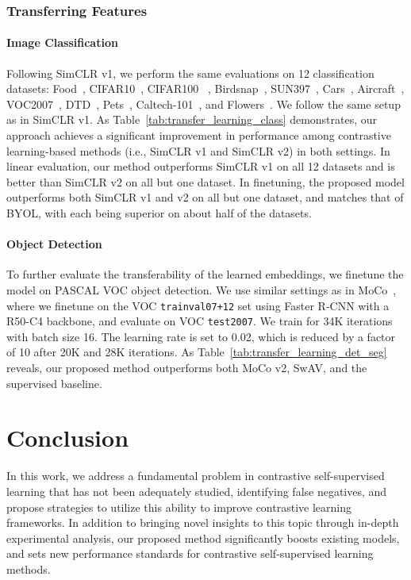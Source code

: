 \documentclass[10pt,twocolumn,letterpaper]{article}
\begin{document}
\subsubsection{Transferring Features}

\paragraph{Image Classification} Following SimCLR v1, we perform the same evaluations on 12 classification datasets: Food~\cite{food101}, CIFAR10~\cite{cifar10-cifar100}, CIFAR100 ~\cite{cifar10-cifar100}, Birdsnap~\cite{birdsnap}, SUN397~\cite{sun397}, Cars~\cite{cars}, Aircraft~\cite{aircraft}, VOC2007~\cite{voc2007-voc2012}, DTD~\cite{DTD}, Pets~\cite{pets}, Caltech-101~\cite{caltech-101}, and Flowers~\cite{flowers}. We follow the same setup as in SimCLR v1. As Table~\ref{tab:transfer_learning_class} demonstrates, our approach achieves a significant improvement in performance among contrastive learning-based methods (i.e., SimCLR v1 and SimCLR v2) in both settings. In linear evaluation, our method outperforms SimCLR v1 on all 12 datasets and is better than SimCLR v2 on all but one dataset. In finetuning, the proposed model outperforms both SimCLR v1 and v2 on all but one dataset, and matches that of BYOL, with each being superior on about half of the datasets.
\vspace{-9pt}
\paragraph{Object Detection} To further evaluate the transferability of the learned embeddings, we finetune the model on PASCAL VOC object detection. We use similar settings as in MoCo~\cite{he2019moco}, where we finetune on the VOC \verb|trainval07+12| set using Faster R-CNN with a R50-C4 backbone, and evaluate on VOC \verb|test2007|. We train for 34K iterations with batch size 16. The learning rate is set to 0.02, which is reduced by a factor of 10 after 20K and 28K iterations.
As Table~\ref{tab:transfer_learning_det_seg} reveals, our proposed method outperforms both MoCo v2, SwAV, and the supervised baseline.

 \section{Conclusion}
\label{sec:conclusion}
In this work, we address a fundamental problem in contrastive self-supervised learning that has not been adequately studied, identifying false negatives, and propose strategies to utilize this ability to improve contrastive learning frameworks. In addition to bringing novel insights to this topic through in-depth experimental analysis, our proposed method significantly boosts existing models, and sets new performance standards for contrastive self-supervised learning methods. 

{\small

}
\end{document}
